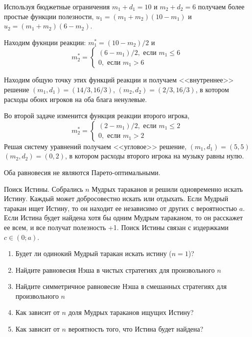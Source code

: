 \begin{solution}
Используя бюджетные ограничения $m_1+d_1=10$ и $m_2+d_2=6$ получаем более простые функции полезности, $u_1=(m_1+m_2)(10-m_1)$ и $u_2=(m_1+m_2)(6-m_2)$. 

Находим фукнции реакции: $m_1^*=(10-m_2)/2$ и 
\[
m_2^*=
\begin{cases}
(6-m_1)/2, \text{ если } m_1 \leq 6 \\
0, \text{ если } m_1 > 6
\end{cases}
\]

Находим общую точку этих функций реакции и получаем <<внутреннее>> решение $(m_1,d_1)=(14/3,16/3)$, $(m_2,d_2)=(2/3,16/3)$, в котором расходы обоих игроков на оба блага ненулевые. 

Во второй задаче изменится функция реакции второго игрока, 
\[
m_2^*=
\begin{cases}
(2-m_1)/2, \text{ если } m_1 \leq 2 \\
0, \text{ если } m_1 > 2
\end{cases}
\]
Решая систему уравнений получаем <<угловое>> решение, $(m_1,d_1)=(5,5)$ $(m_2,d_2)=(0,2)$, в котором расходы второго игрока на музыку равны нулю.

Оба равновесия не являются Парето-оптимальными.
\end{solution}


\begin{problem} 
Поиск Истины.
Собрались $n$ Мудрых тараканов и решили одновременно искать Истину. Каждый может добросовестно искать или отдыхать. Если Мудрый таракан ищет Истину, то он находит ее независимо от других с вероятностью $a$. Если Истина будет найдена хотя бы одним Мудрым тараканом, то он расскажет ее всем, и все получат полезность +1. Поиск Истины связан с издержками $c\in(0;a)$. 
\begin{enumerate}
\item Будет ли одинокий Мудрый таракан искать истину ($n=1$)? 
\item Найдите равновесия Нэша в чистых стратегиях для произвольного $n$ 
\item Найдите симметричное равновесие Нэша в смешанных стратегиях для произвольного $n$ 
\item Как зависит от $n$ доля Мудрых тараканов ищущих Истину? 
\item Как зависит от $n$ вероятность того, что Истина будет найдена? 
\end{enumerate}
\end{problem}


